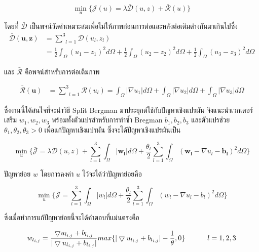 \documentclass[hidelinks,a4paper,14pt]{article}
\numberwithin{equation}{section}							%
\begin{document}
{			$$\min_{u} \{ \mathcal{J}(u)= \lambda \mathcal{\bar{D}}(u,z)+  \mathcal{\bar{R}}(u) \}$$
			
			โดยที่ $\mathcal{\bar{D}}$ เป็นพจน์วัดค่าเหมาะสมเพื่อไม่ให้ภาพก่อนการต่อและหลังต่อเติมต่างกันมาเกินไปซึ่ง
			\begin{align*}
			\mathcal{\bar{D}}(\boldsymbol{u},\boldsymbol{z})  &= \underset{l=1}{\overset{3}{\sum}}\mathcal{D}(u_l,z_l) \\
			&= \frac{1}{2}\int_{\Omega}^{}(u_1 - z_1)^2 d\Omega + \frac{1}{2}\int_{\Omega}^{}(u_2 - z_2)^2 d\Omega + \frac{1}{2}\int_{\Omega}^{}(u_3 - z_3)^2 d\Omega
			\end{align*}
			
			และ $ \mathcal{\bar{R}} $ คือพจน์สำหรับการต่อเติมภาพ 
			
			\begin{align*}
			\mathcal{\bar{R}}(\boldsymbol{u}) &= \underset{l=1}{\overset{3}{\sum}}\mathcal{R}(u_l) = \int_{\Omega}^{}\lvert\nabla u_1 \rvert d\Omega + \int_{\Omega}^{}\lvert\nabla u_2 \rvert d\Omega + \int_{\Omega}^{}\lvert\nabla u_3 \rvert d\Omega
			\end{align*}
			
			ซึ่งงานนี้ได้สนใจที่จะนำวิธี Split Bergman มาประยุกต์ใช้กับปัญหาเชิงแปรผัน จึงแนะนำเวกเตอร์เสริม $w_1, w_2, w_3$ พร้อมทั้งตัวแปรสำหรับการทำซ้ำ Bregman $b_1, b_2, b_3$ และตัวแปรช่วย $\theta_1, \theta_2, \theta_3 > 0 $ เพื่อแก้ปัญหาเชิงแปรผัน ซึ่งจะได้ปัญหาเชิงแปรผันเป็น
			
			$$ 
			\min_{u} \{\bar{\mathcal{J}}= \lambda \mathcal{\bar{D}}(u,z) +  \underset{l=1}{\overset{3}{\sum}} \int_{\Omega}^{}|\boldsymbol{w_l}|d\Omega
			+ \frac{\theta_l}{2} \underset{l=1}{\overset{3}{\sum}}\int_{\Omega}^{}(\boldsymbol{w_l} - \nabla u_l - \boldsymbol{b_l})^{2}d\Omega\}
			$$
			
			
			
			ปัญหาย่อย $w$ โดยการคงค่า $u$ ไว้จะได้ว่าปัญหาย่อยคือ
			
			$$ 
			\min_{u} \{\bar{\mathcal{J}}= \underset{l=1}{\overset{3}{\sum}} \int_{\Omega}^{}|{w_l}|d\Omega
			+ \frac{\theta_l}{2} \underset{l=1}{\overset{3}{\sum}}\int_{\Omega}^{}({w_l} - \nabla u_l - {b_l})^{2}d\Omega\}
			$$
			
			ซึ่งเมื่อทำการแก้ปัญหาย่อยนี้จะได้คำตอบที่แม่นตรงคือ
			
			$$ w_{l_{i,j}} = \frac{\bigtriangledown u_{l_{i,j}}  + b_{l_{i,j}} }{ | \bigtriangledown u_{l_{i,j}}  + b_{l_{i,j}} | } max \{  | \bigtriangledown u_{l_{i,j}}  + b_{l_{i,j}} | - \frac{1}{\theta} , 0\} \hspace{1cm}  \hspace{0.1cm} l = 1,2,3$$ 
			
}
\end{document}
